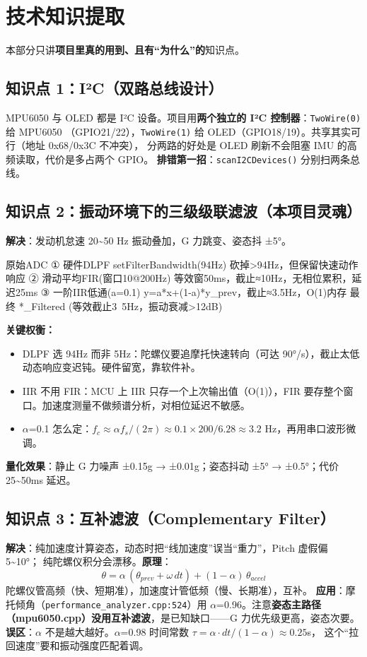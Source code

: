 \documentclass[UTF8,11pt,a4paper]{ctexart}
\begin{document}
\section{技术知识提取}
\noindent 本部分只讲\textbf{项目里真的用到、且有“为什么”的}知识点。

\subsection{知识点 1：I²C（双路总线设计）}
MPU6050 与 OLED 都是 I²C 设备。项目用\textbf{两个独立的 I²C 控制器}：\texttt{TwoWire(0)} 给 MPU6050
（GPIO21/22），\texttt{TwoWire(1)} 给 OLED（GPIO18/19）。共享其实可行（地址 0x68/0x3C 不冲突），
分两路的好处是 OLED 刷新不会阻塞 IMU 的高频读取，代价是多占两个 GPIO。
\textbf{排错第一招}：\texttt{scanI2CDevices()} 分别扫两条总线。

\subsection{知识点 2：振动环境下的三级级联滤波（本项目灵魂）}
\textbf{解决}：发动机怠速 20\textasciitilde 50 Hz 振动叠加，G 力跳变、姿态抖 ±5°。
\begin{ascii}
原始ADC
  ① 硬件DLPF setFilterBandwidth(94Hz)   砍掉>94Hz，但保留快速动作响应
  ② 滑动平均FIR(窗口10@200Hz)            等效窗50ms，截止≈10Hz，无相位累积，延迟25ms
  ③ 一阶IIR低通(a=0.1)                   y=a*x+(1-a)*y_prev，截止≈3.5Hz，O(1)内存
  最终 *_Filtered (等效截止3~5Hz，振动衰减>12dB)
\end{ascii}
\textbf{关键权衡：}
\begin{itemize}
  \item DLPF 选 94Hz 而非 5Hz：陀螺仪要追摩托快速转向（可达 90°/s），截止太低动态响应变迟钝。硬件留宽，靠软件补。
  \item IIR 不用 FIR：MCU 上 IIR 只存一个上次输出值（O(1)），FIR 要存整个窗口。加速度测量不做频谱分析，对相位延迟不敏感。
  \item \(\alpha\)=0.1 怎么定：$f_c \approx \alpha f_s/(2\pi) \approx 0.1\times200/6.28 \approx 3.2$ Hz，再用串口波形微调。
\end{itemize}
\textbf{量化效果}：静止 G 力噪声 ±0.15g → ±0.01g；姿态抖动 ±5° → ±0.5°；代价 25\textasciitilde 50ms 延迟。

\subsection{知识点 3：互补滤波（Complementary Filter）}
\textbf{解决}：纯加速度计算姿态，动态时把“线加速度”误当“重力”，Pitch 虚假偏 5\textasciitilde 10°；
纯陀螺仪积分会漂移。\textbf{原理}：
\[ \theta = \alpha\,(\theta_{prev}+\omega\,dt) + (1-\alpha)\,\theta_{accel} \]
陀螺仪管高频（快、短期准），加速度计管低频（慢、长期准），互补。
\textbf{应用}：摩托倾角（\texttt{performance\_analyzer.cpp:524}）用 \(\alpha\)=0.96。注意\textbf{姿态主路径
（mpu6050.cpp）没用互补滤波}，是已知缺口——G 力优先级更高，姿态次要。
\textbf{误区}：\(\alpha\) 不是越大越好。\(\alpha\)=0.98 时间常数 $\tau=\alpha\cdot dt/(1-\alpha)\approx0.25$s，
这个“拉回速度”要和振动强度匹配着调。
\end{document}
